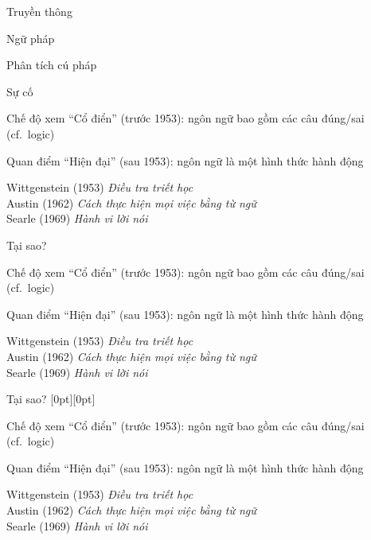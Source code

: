 \documentclass{article}
\begin{document}
\begin{huge}

\sf


\blob Truyền thông

\blob Ngữ pháp

\blob Phân tích cú pháp

\blob Sự cố





Chế độ xem ``Cổ điển'' (trước 1953):\al
   ngôn ngữ bao gồm các câu đúng/sai (cf.~logic)

Quan điểm ``Hiện đại'' (sau 1953):\al
   ngôn ngữ là một hình thức hành động

Wittgenstein (1953) \emph{Điều tra triết học}\\
Austin (1962) \emph{Cách thực hiện mọi việc bằng từ ngữ}\\
Searle (1969) \emph{Hành vi lời nói}

Tại sao?



Chế độ xem ``Cổ điển'' (trước 1953):\al
   ngôn ngữ bao gồm các câu đúng/sai (cf.~logic)

Quan điểm ``Hiện đại'' (sau 1953):\al
   ngôn ngữ là một hình thức hành động

Wittgenstein (1953) \emph{Điều tra triết học}\\
Austin (1962) \emph{Cách thực hiện mọi việc bằng từ ngữ}\\
Searle (1969) \emph{Hành vi lời nói}

Tại sao? \hspace*{5.5in}\epsfxsize=2in\raisebox{-1.5in}[0pt][0pt]{}


Chế độ xem ``Cổ điển'' (trước 1953):\al
   ngôn ngữ bao gồm các câu đúng/sai (cf.~logic)

Quan điểm ``Hiện đại'' (sau 1953):\al
   ngôn ngữ là một hình thức hành động

Wittgenstein (1953) \emph{Điều tra triết học}\\
Austin (1962) \emph{Cách thực hiện mọi việc bằng từ ngữ}\\
Searle (1969) \emph{Hành vi lời nói}


\end{huge}
\end{document}
